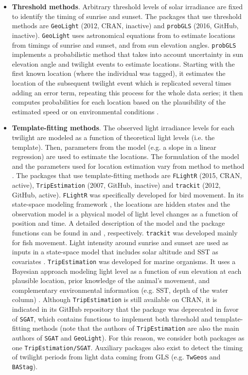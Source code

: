 \documentclass[a4paper,12pt]{article}
\newcommand{\Rpkg}[1]{\texttt{#1}}
\begin{document}
\begin{itemize}
        \item \textbf{Threshold methods}. Arbitrary threshold levels of solar irradiance are fixed to identify the timing of sunrise and sunset. The packages that use threshold methods are \Rpkg{GeoLight} (2012, CRAN, inactive) and \Rpkg{probGLS} (2016, GitHub, inactive). \Rpkg{GeoLight} uses astronomical equations from \cite{Montenbruck2013} to estimate locations from timings of sunrise and sunset, and from sun elevation angles. \Rpkg{probGLS} implements a probabilistic method that takes into account uncertainty in sun elevation angle and twilight events to estimate locations. Starting with the first known location (where the individual was tagged), it estimates the location of the subsequent twilight event which is replicated several times adding an error term, repeating this process for the whole data series; it then computes probabilities for each location based on the plausibility of the estimated speed or on environmental conditions \citep[e.g. sea surface temperature SST,][]{Merkel2016}. 
        \item \textbf{Template-fitting methods}. The observed light irradiance levels for each twilight are modeled as a function of theoretical light levels (i.e. the template). Then, parameters from the model (e.g. a slope in a linear regression) are used to estimate the locations. The formulation of the model and the parameters used for location estimation vary from method to method \citep{Ekstrom2004}. The packages that use template-fitting methods are \Rpkg{FLightR} (2015, CRAN, active), \Rpkg{TripEstimation} (2007, GitHub, inactive) and \Rpkg{trackit} (2012, GitHub, active). \Rpkg{FLightR} was specifically developed for bird movement. In its state-space modeling framework \citep{Patterson2008}, the locations are hidden states and the observation model is a physical model of light level changes as a function of position and time. A detailed description of the model and the package functions can be found in \cite{Rakhimberdiev2015} and \cite{Rakhimberdiev2017}, respectively. \Rpkg{trackit} was developed mainly for fish movement. Light intensity around sunrise and sunset are used as inputs in a state-space model that includes solar altitude and SST as covariates \citep{Lam2010}. \Rpkg{TripEstimation} was developed for marine organisms. It uses a Bayesian approach modeling light level as a function of sun elevation at each plausible location, prior knowledge of the animal's movement, and complementary environmental information (e.g. SST, depth of the water column) \citep{Sumner2009}. Although \Rpkg{TripEstimation} is still available on CRAN, it is indicated in its GitHub repository that the package was deprecated in favor of \Rpkg{SGAT}, which contains functions to implement both threshold and template-fitting methods (note that the authors of \Rpkg{TripEstimation} are also the main authors of \Rpkg{SGAT} and \Rpkg{GeoLight}). For this reason, we consider both packages as one \Rpkg{TripEstimation/SGAT}. Auxiliary packages also exist to detect the timing of twilight periods from light data coming from GLS (e.g. \Rpkg{TwGeos} and \Rpkg{BAStag}). %

\end{itemize}
\end{document}
